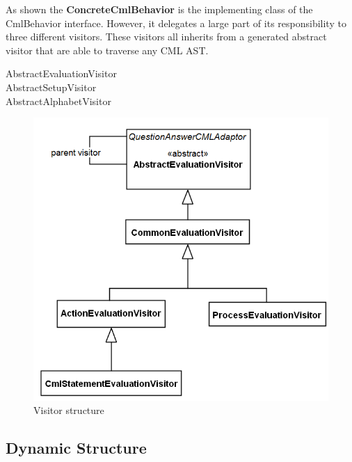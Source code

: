 \documentclass[a4paper, 12pt]{include/compassreport}   %
\begin{document}
As shown the \textbf{ConcreteCmlBehavior} is the implementing class of
the CmlBehavior interface. However, it delegates a large part of its
responsibility to three different visitors. These visitors all
inherits from a generated abstract visitor that are able to traverse
any CML AST. 

\begin{description}
\item[AbstractEvaluationVisitor]
\item[AbstractSetupVisitor]
\item[AbstractAlphabetVisitor]
\end{description}



\begin{figure}[ht!]
  \begin{center}
    \includegraphics[width=1\textwidth]{figures/Visitors}
    \caption{Visitor structure}
    \label{fig:visitors}
  \end{center}
\end{figure}



\subsection{Dynamic Structure}
\label{sec:dynamic_structure}


\newpage

 
\label{ch:bib} %
\end{document}
